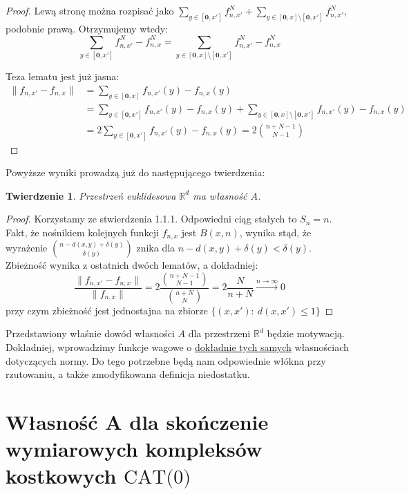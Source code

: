 \documentclass[licencjacka]{pracamgr}
\theoremstyle{definition}
\theoremstyle{definition}
\theoremstyle{definition}
\theoremstyle{definition}
\theoremstyle{definition}
\theoremstyle{plain}
\theoremstyle{plain}
\newtheorem{theorem}{Twierdzenie}[section]
\begin{document}
\begin{proof}
	Lewą stronę można rozpisać jako $  \sum_{y \in [\textbf{0},x']} f_{n,x'}^N + 
	 \sum_{y \in [\textbf{0},x] \setminus [\textbf{0}, x']} f_{n,x'}^N  $, podobnie prawą. 
	Otrzymujemy wtedy:
	$$  \sum\limits_{y \in [\textbf{0},x']} f_{n,x'}^N - f_{n,x}^N =
	   \sum\limits_{y \in [\textbf{0},x]\setminus [\textbf{0},x']} f_{n,x'}^N - f_{n,x}^N $$

	Teza lematu jest już jasna:
 	\begin{align*} 
		\|f_{n,x'} - f_{n,x} \| & =\sum\limits_{y\in [\textbf{0},x]} f_{n,x'}(y) - f_{n,x}(y) \\
		&= \sum\limits_{y\in [\textbf{0},x']} f_{n,x'}(y) - f_{n,x}(y)  + 
		\sum\limits_{y\in [\textbf{0},x]\setminus [\textbf{0},x']} f_{n,x'}(y) - f_{n,x}(y)\\ 
		& = 2\sum\limits_{y\in [\textbf{0},x']} f_{n,x'}(y) - f_{n,x}(y) = 2{n + N-1 
		\choose N-1}
	\end{align*}
\end{proof}

Powyższe wyniki prowadzą już do następującego twierdzenia:

\begin{theorem}
	Przestrzeń euklidesowa $ \mathbb{R}^d $ ma własność $ A $.
\end{theorem}
\begin{proof}
	Korzystamy ze stwierdzenia 1.1.1. Odpowiedni ciąg stałych to $ S_n = n $. Fakt, 
	że nośnikiem kolejnych funkcji $ f_{n,x} $ jest $ B(x,n) $, wynika stąd, że 
	wyrażenie $ {n - d(x,y) + \delta(y) \choose \delta(y)} $ znika dla $ n - d(x,y) + \delta(y)
	< \delta(y) $. Zbieżność wynika z ostatnich dwóch lematów, a dokładniej:
	$$ \frac{\|f_{n,x'} - f_{n,x} \|}{ \|f_{n,x} \|} = 2\frac{{n + N - 1 \choose {N - 1}}}
	{{n + N \choose N}} = 2 \frac{N}{n + N} \xrightarrow{n \rightarrow \infty} 0 $$
	przy czym zbieżność jest jednostajna na zbiorze $ \{(x,x'): ~ d(x,x') \leq 1\} $
\end{proof}

Przedstawiony właśnie dowód własności $ A $ dla przestrzeni $ \mathbb{R}^d $ będzie 
motywacją. Dokładniej, wprowadzimy funkcje wagowe o \underline{dokładnie tych samych} 
własnościach dotyczących normy. Do tego potrzebne będą nam odpowiednie 
włókna przy rzutowaniu, a także zmodyfikowana definicja niedostatku.

\section{Własność A dla skończenie wymiarowych kompleksów kostkowych $ \text{CAT(0)} $}
\end{document}
